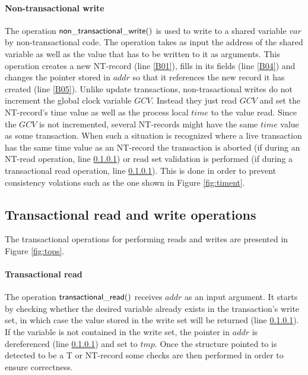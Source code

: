 \documentclass[11pt,letterpaper]{article}
\begin{document}
\paragraph{Non-transactional write}
The operation ${\sf non\_transactional\_write()}$ is used to write to 
a shared variable $\mathit{var}$ 
by non-transactional code.
The operation takes as input the address of the shared variable as well as the 
value that has to be written to it as arguments.
This operation  
creates a  new  NT-record  (line  \ref{B01}),  fills  in  its  fields  (line
\ref{B04})  and 
changes the pointer stored in $\mathit{addr}$ so that it references the 
new record it has created  (line \ref{B05}).
Unlike update transactions, non-trasactional writes do not increment
the global clock variable $\mathit{GCV}$.
Instead they just read $\mathit{GCV}$ and set the NT-record's time value as well as
the process local $\mathit{time}$ to the value read.
Since the $\mathit{GCV}$ is not incremented, several NT-records might have the same
$\mathit{time}$ value as some transaction.
When such a situation is recognized where a live transaction has the same time value
as an NT-record the transaction is aborted (if during an NT-read operation,
line \ref{}) or read set validation is performed (if during a transactional
read operation, line \ref{}).
This is done in order to prevent consistency volations such as the one shown 
in Figure \ref{fig:timent}.


\subsection{Transactional read and write operations}

The transactional operations for performing reads and writes are 
presented in Figure \ref{fig:tops}. 

\paragraph{Transactional read}

The operation ${\sf  transactional\_read()}$ receives $\mathit{addr}$ as an
input argument. It starts by checking  
whether the  desired variable already  exists in the  transaction{}'s write
set, in which  
case  the   value  stored  in  the   write  set  will   be  returned  (line
\ref{}). If the variable is not contained  
in  the write  set, the  pointer in  $\mathit{addr}$ is  dereferenced (line
\ref{}) and set to $\mathit{tmp}$. Once the structure pointed to is detected to be a T or NT-record
some checks are then performed in order to ensure correctness.
\end{document}

